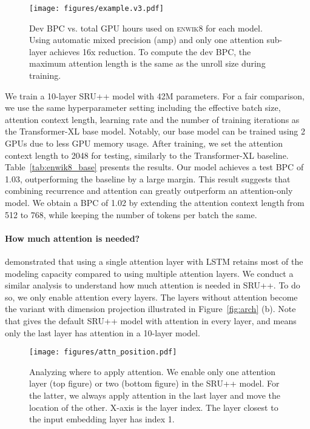 \begin{figure}[!t!]
\texttt{[image: figures/example.v3.pdf]}
    \caption{Dev BPC vs. total GPU hours used on \textsc{enwik8} for each model. 
Using automatic mixed precision (amp) and only one attention sub-layer achieves 16x reduction.
    To compute the dev BPC, the maximum attention length is the same as the unroll size  during training.}
    \label{fig:enwik8_base}
\end{figure}

We train a 10-layer SRU++ model with 42M parameters. For a fair comparison, we use the same hyperparameter setting including the effective batch size, attention context length, learning rate and the number of training iterations as the Transformer-XL base model.
Notably, our base model can be trained using 2 GPUs due to less GPU memory usage. 
After training, we set the attention context length to 2048 for testing, similarly to the Transformer-XL baseline.
Table~\ref{tab:enwik8_base} presents the results.
Our model achieves a test BPC of 1.03, outperforming the baseline by a large margin.
This result suggests that combining recurrence and attention can greatly outperform an attention-only model.
We obtain a BPC of 1.02 by extending the attention context length from 512 to 768, while keeping the number of tokens per batch the same.

\paragraph{How much attention is needed?}
\citet{merity2019single} demonstrated that using a single attention layer with LSTM retains most of the modeling capacity compared to using multiple attention layers.
We conduct a similar analysis to understand how much attention is needed in SRU++.
To do so, we only enable attention every  layers.
The layers without attention become the variant with dimension projection illustrated in Figure~\ref{fig:arch} (b).
Note that  gives the default SRU++ model with attention in every layer, and  means only the last layer has attention in a 10-layer model.

\begin{figure}[!t!]
\texttt{[image: figures/attn\_position.pdf]}
\caption{
Analyzing where to apply attention.
We enable only one attention layer (top figure) or two (bottom figure) in the SRU++ model.
For the latter, we always apply attention in the last layer and move the location of the other.
X-axis is the layer index. The layer closest to the input embedding layer has index 1.
}
\label{fig:attn_position}
\end{figure}

